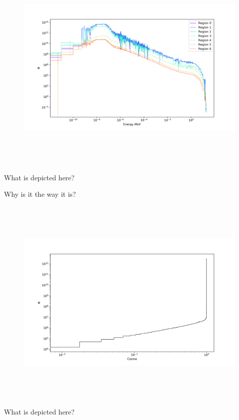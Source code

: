 %
\begin{figure}[htb]
\centering
\includegraphics[height=4in]{tex/figures/flux_rad_erg.png}
\caption[]{}
\label{fig:}
\end{figure}

What is depicted here?

Why is it the way it is?

\clearpage

%
\begin{figure}[htb]
\centering
\includegraphics[height=4in]{tex/figures/flux_cos.png}
\caption[]{}
\label{fig:}
\end{figure}

What is depicted here?

